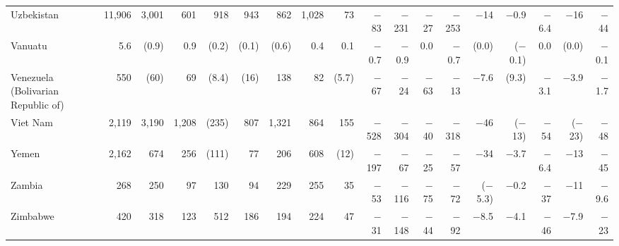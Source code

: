 \begin{longtable}{lrrrrrrrrrrrrrrrrr}
Uzbekistan & 11,906 & 3,001 & 601 & 918 & 943 & 862 & 1,028 & 73 & $-$83 & $-$231 & $-$27 & $-$253 & $-$14 & $-$0.9 & $-$6.4 & $-$16 & $-$44 \\
Vanuatu & 5.6 & (0.9) & 0.9 & (0.2) & (0.1) & (0.6) & 0.4 & 0.1 & $-$0.7 & $-$0.9 & 0.0 & $-$0.7 & (0.0) & ($-$0.1) & 0.0 & (0.0) & $-$0.1 \\
Venezuela (Bolivarian Republic of) & 550 & (60) & 69 & (8.4) & (16) & 138 & 82 & (5.7) & $-$67 & $-$24 & $-$63 & $-$13 & $-$7.6 & (9.3) & $-$3.1 & $-$3.9 & $-$1.7 \\
Viet Nam & 2,119 & 3,190 & 1,208 & (235) & 807 & 1,321 & 864 & 155 & $-$528 & $-$304 & $-$40 & $-$318 & $-$46 & ($-$13) & $-$54 & ($-$23) & $-$48 \\
Yemen & 2,162 & 674 & 256 & (111) & 77 & 206 & 608 & (12) & $-$197 & $-$67 & $-$25 & $-$57 & $-$34 & $-$3.7 & $-$6.4 & $-$13 & $-$45 \\
Zambia & 268 & 250 & 97 & 130 & 94 & 229 & 255 & 35 & $-$53 & $-$116 & $-$75 & $-$72 & ($-$5.3) & $-$0.2 & $-$37 & $-$11 & $-$9.6 \\
Zimbabwe & 420 & 318 & 123 & 512 & 186 & 194 & 224 & 47 & $-$31 & $-$148 & $-$44 & $-$92 & $-$8.5 & $-$4.1 & $-$46 & $-$7.9 & $-$23 \\
\end{longtable}
